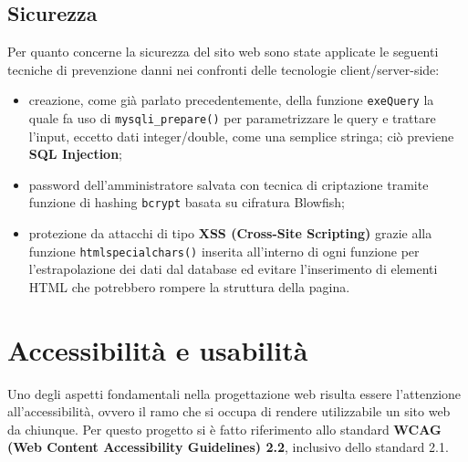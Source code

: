 \documentclass[a4paper,10pt]{article}
\begin{document}
	\subsection{Sicurezza}
	Per quanto concerne la sicurezza del sito web sono state applicate le seguenti tecniche di prevenzione danni nei confronti delle tecnologie client/server-side:
	\begin{itemize}
		\item creazione, come già parlato precedentemente, della funzione \texttt{exeQuery} la quale fa uso di \texttt{mysqli\_prepare()} per parametrizzare le query e trattare l'input, eccetto dati integer/double, come una semplice stringa; ciò previene \textbf{SQL Injection};
		\item password dell'amministratore salvata con tecnica di criptazione tramite funzione di hashing \texttt{bcrypt} basata su cifratura Blowfish;
		\item protezione da attacchi di tipo \textbf{XSS (Cross-Site Scripting)} grazie alla funzione \texttt{htmlspecialchars()} inserita all'interno di ogni funzione per l'estrapolazione dei dati dal database ed evitare l'inserimento di elementi HTML che potrebbero rompere la struttura della pagina.
	\end{itemize}
	\section{Accessibilità e usabilità}
	Uno degli aspetti fondamentali nella progettazione web risulta essere l'attenzione all'accessibilità, ovvero il ramo che si occupa di rendere utilizzabile un sito web da chiunque. Per questo progetto si è fatto riferimento allo standard \textbf{WCAG (Web Content Accessibility Guidelines) 2.2}, inclusivo dello standard 2.1.
\end{document}
